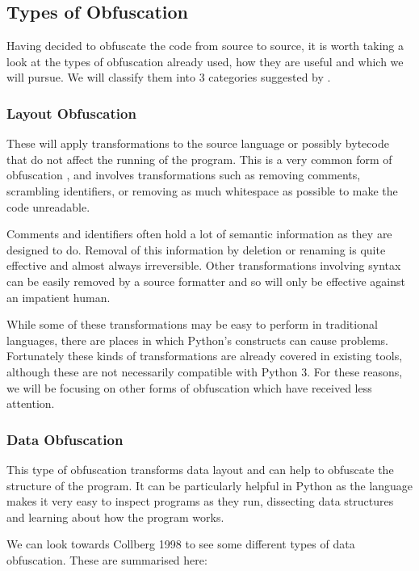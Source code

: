 \documentclass{report}
\begin{document}
\subsection{Types of Obfuscation}

Having decided to obfuscate the code from source to source, it is worth taking a look at the types of
obfuscation already used, how they are useful and which we will pursue. We will classify them into 3 categories
suggested by \cite[p10]{desevobf}.

\subsubsection{Layout Obfuscation}

These will apply transformations to the source language or possibly bytecode that do not affect the running of the
program. This is a very common form of obfuscation \cite[p10]{desevobf}, and involves transformations such as removing comments,
scrambling identifiers, or removing as much whitespace as possible to make the code unreadable.

Comments and identifiers often hold a lot of semantic information as they are designed to do.
Removal of this information by deletion or renaming is quite effective and almost always irreversible. Other transformations involving syntax
can be easily removed by a source formatter and so will only be effective against an impatient human.

While some of these transformations may be easy to perform in traditional languages, there are places in which
Python's constructs can cause problems. Fortunately these kinds of transformations are already covered in existing
tools, although these are not necessarily compatible with Python 3. For these reasons, we will be focusing on other forms of
obfuscation which have received less attention.

\subsubsection{Data Obfuscation}

This type of obfuscation transforms data layout and can help to obfuscate the structure of the program. It can be
particularly helpful in Python as the language makes it very easy to inspect programs as they run, dissecting data
structures and learning about how the program works.

We can look towards Collberg 1998 \cite{dataobf} to see some different types of data obfuscation. These are summarised here:
\end{document}
